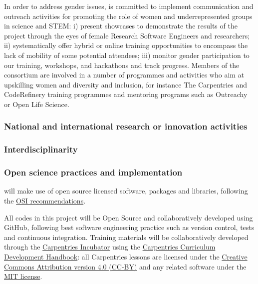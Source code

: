 In order to address gender issues, \TheProject is committed to implement
communication and outreach activities for promoting the role of women and underrepresented groups in science
and STEM: i) present showcases to demonstrate the results of the project through
the eyes of female Research Software Engineers and researchers; ii)
systematically offer hybrid or online training opportunities to encompass the
lack of mobility of some potential attendees; iii) monitor gender participation
to our training, workshops, and hackathons and track progress. Members of the
consortium are involved in a number of programmes and activities who aim at
upskilling women and diversity and inclusion, for instance The Carpentries and
CodeRefinery training programmes and mentoring programs such as Outreachy or
Open Life Science.

\subsubsection{National and international research or innovation activities}

\TOWRITE{}{}

\subsubsection{Interdisciplinarity}

\TOWRITE{}{}

\subsubsection{Open science practices and implementation}

\TheProject will make use of open source licensed software, packages and libraries, following the \href{https://opensource.org/licenses}{OSI recommendations}.

All codes in this project will be Open Source and collaboratively developed using GitHub, following best software engineering practice
such as version control, tests and continuous integration.
Training materials will be collaboratively developed through the \href{https://carpentries-incubator.org/}{Carpentries Incubator}
using the \href{https://cdh.carpentries.org/}{Carpentries Curriculum Development Handbook}: all Carpentries lessons are licensed under
the \href{https://creativecommons.org/licenses/by/4.0/legalcode}{Creative Commons Attribution version 4.0 (CC-BY)} and any related software under
the \href{https://opensource.org/licenses/MIT}{MIT license}.

